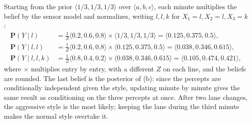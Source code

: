 \documentclass[11pt, a4paper]{exam}
\begin{document}
\begin{exercises}[1, 2, 3, 5]
\begin{parts}
    \begin{solution}
        Starting from the prior $\langle 1/3, 1/3, 1/3 \rangle$ over $\langle a, b, c \rangle$, each minute multiplies the belief by the sensor model and normalizes, writing $l, l, k$ for $X_1 = l, X_2 = l, X_3 = k$:
        \begin{align*}
            \mathbf{P}(Y \mid l) & = \tfrac{1}{Z} \langle 0.2, 0.6, 0.8 \rangle \times \langle 1/3, 1/3, 1/3 \rangle = \langle 0.125, 0.375, 0.5 \rangle, \\
            \mathbf{P}(Y \mid l, l) & = \tfrac{1}{Z} \langle 0.2, 0.6, 0.8 \rangle \times \langle 0.125, 0.375, 0.5 \rangle = \langle 0.038, 0.346, 0.615 \rangle, \\
            \mathbf{P}(Y \mid l, l, k) & = \tfrac{1}{Z} \langle 0.8, 0.4, 0.2 \rangle \times \langle 0.038, 0.346, 0.615 \rangle = \langle 0.105, 0.474, 0.421 \rangle,
        \end{align*}
        where $\times$ multiplies entry by entry, with a different $Z$ on each line, and the beliefs are rounded. The last belief is the posterior of (b): since the percepts are conditionally independent given the style, updating minute by minute gives the same result as conditioning on the three percepts at once. After two lane changes, the aggressive style is the most likely; keeping the lane during the third minute makes the normal style overtake it.
    \end{solution}
\end{parts}

\end{exercises}
\end{document}
